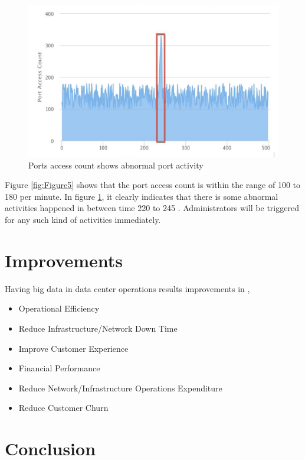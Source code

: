 \documentclass[sigconf]{acmart}
\begin{document}
\begin{figure}[htb]
  \centering
  \includegraphics[width=1.0\columnwidth]{images/Figure6.png}
  \caption{Ports access count shows abnormal port activity
  \cite{streaming-based-network-monitoring-and-threat-detection-system}}
  \label{fig:Figure6} 
\end{figure}

Figure \ref{fig:Figure5} shows that the port access count is within the range of 100 to 180 per minute. In figure \ref{fig:Figure6}, it clearly indicates that there is some abnormal activities happened in between time 220 to 245 \cite{streaming-based-network-monitoring-and-threat-detection-system}. Administrators will be triggered for any such kind of activities immediately. 


\section{Improvements}

Having big data in data center operations results improvements in \cite{datacenter-monitoring-and-analytics-platform},

\begin{itemize}
\item Operational Efficiency
\item Reduce Infrastructure/Network Down Time
\item Improve Customer Experience
\item Financial Performance
\item Reduce Network/Infrastructure Operations Expenditure
\item Reduce Customer Churn
\end{itemize}


\section{Conclusion}
\end{document}
